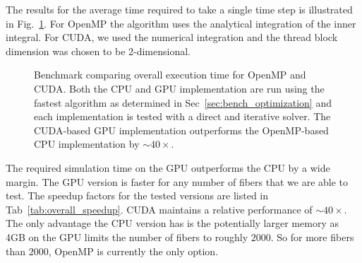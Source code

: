 The results for the average time required to take a single time step is illustrated in Fig.~\ref{fig:overall}. For OpenMP the algorithm uses the analytical integration of the inner integral. For CUDA, we used the numerical integration and the thread block dimension was chosen to be 2-dimensional.

\begin{figure}[!htbp]
  \centering
  \caption[Benchmark overall execution time.]{Benchmark comparing overall execution time for OpenMP and CUDA. Both the CPU and GPU implementation are run using the fastest algorithm as determined in Sec~\ref{sec:bench_optimization} and each implementation is tested with a direct and iterative solver. The CUDA-based GPU implementation outperforms the OpenMP-based CPU implementation by ${\sim}40×$.}
  \label{fig:overall}
\end{figure}

The required simulation time on the GPU outperforms the CPU by a wide margin. The GPU version is faster for any number of fibers that we are able to test. The speedup factors for the tested versions are listed in Tab~\ref{tab:overall_speedup}. CUDA maintains a relative performance of ${\sim}40×$. The only advantage the CPU version has is the potentially larger memory as 4GB on the GPU limits the number of fibers to roughly $2000$. So for more fibers than $2000$, OpenMP is currently the only option.


